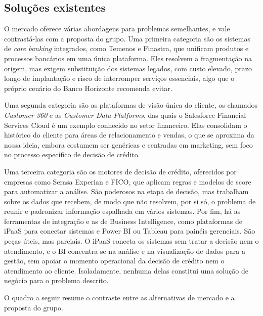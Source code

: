 \documentclass[12pt,a4paper]{article}
\begin{document}
\subsection{Solu\c{c}\~oes existentes}

O mercado oferece v\'arias abordagens para problemas semelhantes, e vale contrast\'a-las com a proposta do grupo. Uma primeira categoria s\~ao os sistemas de \textit{core banking} integrados, como Temenos e Finastra, que unificam produtos e processos banc\'arios em uma \'unica plataforma. Eles resolvem a fragmenta\c{c}\~ao na origem, mas exigem substitui\c{c}\~ao dos sistemas legados, com custo elevado, prazo longo de implanta\c{c}\~ao e risco de interromper servi\c{c}os essenciais, algo que o pr\'oprio cen\'ario do Banco Horizonte recomenda evitar.

Uma segunda categoria s\~ao as plataformas de vis\~ao \'unica do cliente, os chamados \textit{Customer 360} e as \textit{Customer Data Platforms}, das quais o Salesforce Financial Services Cloud \'e um exemplo conhecido no setor financeiro. Elas consolidam o hist\'orico do cliente para \'areas de relacionamento e vendas, o que se aproxima da nossa ideia, embora costumem ser gen\'ericas e centradas em marketing, sem foco no processo espec\'ifico de decis\~ao de cr\'edito.

Uma terceira categoria s\~ao os motores de decis\~ao de cr\'edito, oferecidos por empresas como Serasa Experian e FICO, que aplicam regras e modelos de score para automatizar a an\'alise. S\~ao poderosos na etapa de decis\~ao, mas trabalham sobre os dados que recebem, de modo que n\~ao resolvem, por si s\'o, o problema de reunir e padronizar informa\c{c}\~ao espalhada em v\'arios sistemas. Por fim, h\'a as ferramentas de integra\c{c}\~ao e as de Business Intelligence, como plataformas de iPaaS para conectar sistemas e Power BI ou Tableau para pain\'eis gerenciais. S\~ao pe\c{c}as \'uteis, mas parciais. O iPaaS conecta os sistemas sem tratar a decis\~ao nem o atendimento, e o BI concentra-se na an\'alise e na visualiza\c{c}\~ao de dados para a gest\~ao, sem apoiar o momento operacional da decis\~ao de cr\'edito nem o atendimento ao cliente. Isoladamente, nenhuma delas constitui uma solu\c{c}\~ao de neg\'ocio para o problema descrito.

O quadro a seguir resume o contraste entre as alternativas de mercado e a proposta do grupo.
\end{document}
